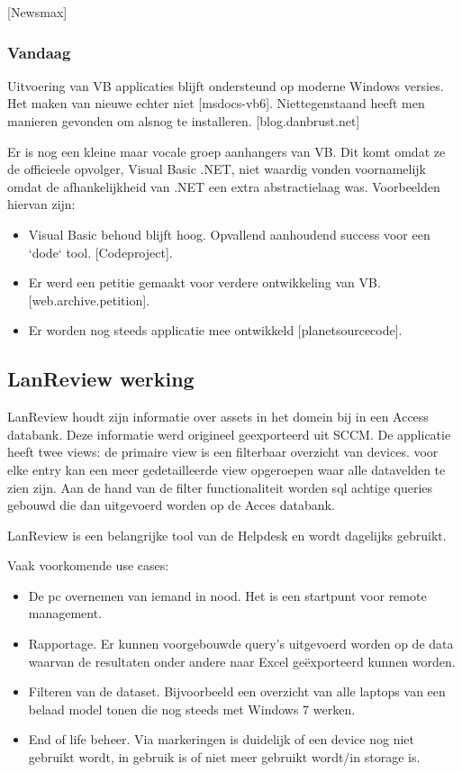 [Newsmax]

\subsubsection{Vandaag}

Uitvoering van VB applicaties blijft ondersteund op moderne Windows versies. Het maken van nieuwe echter niet [msdocs-vb6]. Niettegenstaand heeft men manieren gevonden om alsnog te installeren. [blog.danbrust.net]

Er is nog een kleine maar vocale groep aanhangers van VB. Dit komt omdat ze de officieele opvolger, Visual Basic .NET, niet waardig vonden voornamelijk omdat de afhankelijkheid van .NET een extra abstractielaag was. Voorbeelden hiervan zijn:
\begin{itemize}
    \item Visual Basic behoud blijft hoog. Opvallend aanhoudend success voor een `dode` tool. [Codeproject].
    \item Er werd een petitie gemaakt voor verdere ontwikkeling van VB. [web.archive.petition].
    \item Er worden nog steeds applicatie mee ontwikkeld [planetsourcecode].
\end{itemize}

\subsection{LanReview werking}


LanReview houdt zijn informatie over assets in het domein bij in een Access databank. Deze informatie werd origineel geexporteerd uit SCCM.
De applicatie heeft twee views: de primaire view is een filterbaar overzicht van devices. voor elke entry kan een meer gedetailleerde view opgeroepen waar alle datavelden te zien zijn.
Aan de hand van de filter functionaliteit worden sql achtige queries gebouwd die dan uitgevoerd worden op de Acces databank.

LanReview is een belangrijke tool van de Helpdesk en wordt dagelijks gebruikt.

Vaak voorkomende use cases:
\begin{itemize}
    \item De pc overnemen van iemand in nood. Het is een startpunt voor remote management.
    \item Rapportage. Er kunnen voorgebouwde query's uitgevoerd worden op de data waarvan de resultaten onder andere naar Excel geëxporteerd kunnen worden.
    \item Filteren van de dataset. Bijvoorbeeld een overzicht van alle laptops van een belaad model tonen die nog steeds met Windows 7 werken.
    \item End of life beheer. Via markeringen is duidelijk of een device nog niet gebruikt wordt, in gebruik is of niet meer gebruikt wordt/in storage is.
\end{itemize}

